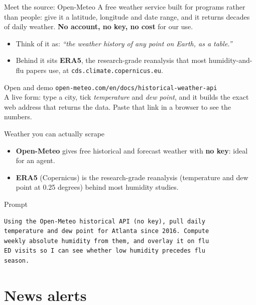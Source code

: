 \documentclass[aspectratio=169,11pt]{beamer}
\begin{document}
\begin{frame}{Meet the source: Open-Meteo}
  A free weather service built for programs rather than people: give it a latitude,
  longitude and date range, and it returns decades of daily weather. \textbf{No account, no
  key, no cost} for our use.
  \begin{itemize}
    \item Think of it as: \emph{``the weather history of any point on Earth, as a table.''}
    \item Behind it sits \textbf{ERA5}, the research-grade reanalysis that most
          humidity-and-flu papers use, at \texttt{cds.climate.copernicus.eu}.
  \end{itemize}
  \begin{exampleblock}{Open and demo}
    \texttt{open-meteo.com/en/docs/historical-weather-api} \\
    A live form: type a city, tick \emph{temperature} and \emph{dew point}, and it builds the
    exact web address that returns the data. Paste that link in a browser to see the numbers.
  \end{exampleblock}
\end{frame}

\begin{frame}[fragile]{Weather you can actually scrape}
  \begin{itemize}
    \item \textbf{Open-Meteo} gives free historical and forecast weather with \textbf{no
          key}: ideal for an agent.
    \item \textbf{ERA5} (Copernicus) is the research-grade reanalysis (temperature and dew
          point at 0.25 degrees) behind most humidity studies.
  \end{itemize}
  \begin{block}{Prompt}
  \begin{lstlisting}
Using the Open-Meteo historical API (no key), pull daily
temperature and dew point for Atlanta since 2016. Compute
weekly absolute humidity from them, and overlay it on flu
ED visits so I can see whether low humidity precedes flu
season.
  \end{lstlisting}
  \end{block}
\end{frame}

\section{News alerts}
\end{document}
